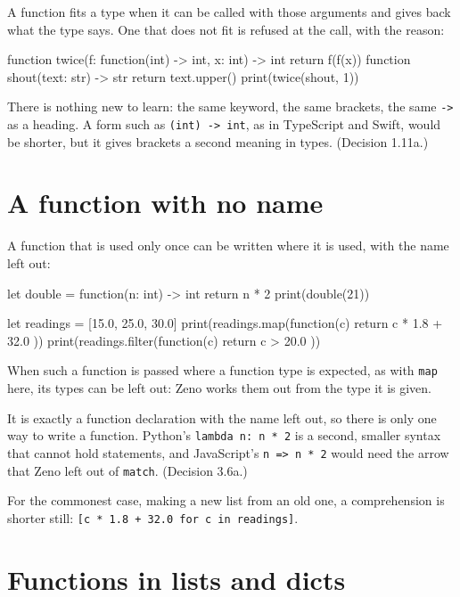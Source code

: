 A function fits a type when it can be called with those arguments and
gives back what the type says. One that does not fit is refused at the
call, with the reason:

\begin{zeno}[fails=yes]
function twice(f: function(int) -> int, x: int) -> int {
    return f(f(x))
}
function shout(text: str) -> str {
    return text.upper()
}
print(twice(shout, 1))
\end{zeno}

\begin{why}
There is nothing new to learn: the same keyword, the same brackets,
the same \verb|->| as a heading. A form such as \verb|(int) -> int|,
as in TypeScript and Swift, would be shorter, but it gives brackets a
second meaning in types. (Decision 1.11a.)
\end{why}

\section{A function with no name}

A function that is used only once can be written where it is used,
with the name left out:

\begin{zeno}
let double = function(n: int) -> int { return n * 2 }
print(double(21))

let readings = [15.0, 25.0, 30.0]
print(readings.map(function(c) { return c * 1.8 + 32.0 }))
print(readings.filter(function(c) { return c > 20.0 }))
\end{zeno}

When such a function is passed where a function type is expected, as
with \verb|map| here, its types can be left out: Zeno works them out
from the type it is given.

\begin{why}
It is exactly a function declaration with the name left out, so there
is only one way to write a function. Python's \verb|lambda n: n * 2|
is a second, smaller syntax that cannot hold statements, and
JavaScript's \verb|n => n * 2| would need the arrow that Zeno left out
of \verb|match|. (Decision 3.6a.)
\end{why}

For the commonest case, making a new list from an old one, a
comprehension is shorter still: \verb|[c * 1.8 + 32.0 for c in readings]|.

\section{Functions in lists and dicts}

